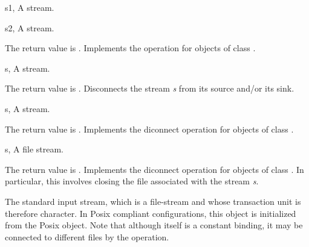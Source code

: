 \begin{optDefinition}
\begin{specargs}
    \item[s1, \classref{stream}] A stream.
    \item[s2, \classref{stream}] A stream.
\end{specargs}
%
\result%
The return value is \nil{}.
%
\remarks%
Implements the  operation for objects of class
.

\begin{genericargs}
    \item[s, \classref{stream}] A stream.
\end{genericargs}
%
\result%
The return value is \nil{}.
%
\remarks%
Disconnects the stream {\em s\/} from its source and/or its sink.

\begin{specargs}
    \item[s, \classref{stream}] A stream.
\end{specargs}
%
\result%
The return value is \nil{}.
%
\remarks%
Implements the diconnect operation for objects of class .

\begin{specargs}
    \item[s, \classref{file-stream}] A file stream.
\end{specargs}
%
\result%
The return value is \nil{}.
%
\remarks%
Implements the diconnect operation for objects of class
. In particular, this involves closing the file associated
with the stream {\em s}.


\remarks%
The standard input stream, which is a file-stream and whose transaction unit is
therefore character. In Posix compliant configurations, this object is
initialized from the Posix  object. Note that although
 itself is a constant binding, it may be connected to
different files by the  operation.


\end{optDefinition}
